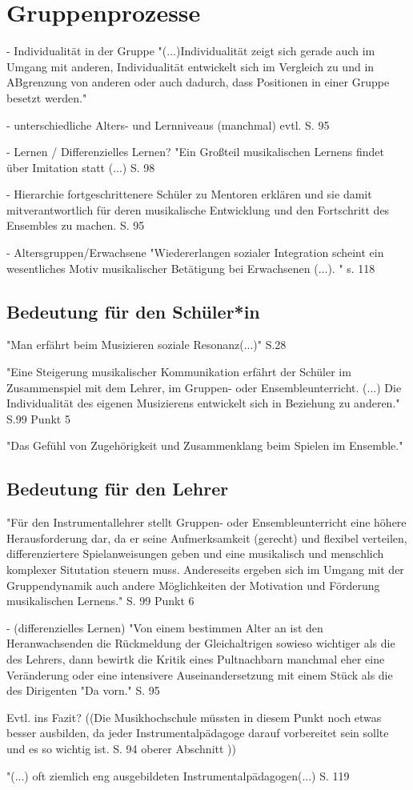 \section{Gruppenprozesse}


- Individualität in der Gruppe 
"(...)Individualität zeigt sich gerade auch im Umgang mit anderen,
Individualität entwickelt sich im Vergleich zu und in ABgrenzung von anderen
oder auch dadurch, dass Positionen in einer Gruppe besetzt werden."

- unterschiedliche Alters- und Lernniveaus (manchmal) evtl. S. 95

- Lernen / Differenzielles Lernen? 
"Ein Großteil musikalischen Lernens findet über Imitation statt (...) S. 98

- Hierarchie
fortgeschrittenere Schüler zu Mentoren erklären und sie damit mitverantwortlich
für deren musikalische Entwicklung und den Fortschritt des Ensembles zu machen.
S. 95

- Altersgruppen/Erwachsene
"Wiedererlangen sozialer Integration scheint ein wesentliches Motiv
musikalischer Betätigung bei Erwachsenen (...). " s. 118


\subsection*{Bedeutung für den Schüler*in}

"Man erfährt beim Musizieren soziale Resonanz(...)" S.28

"Eine Steigerung musikalischer Kommunikation erfährt der Schüler im
Zusammenspiel mit dem Lehrer, im Gruppen- oder Ensembleunterricht. (...) Die Individualität des eigenen Musizierens entwickelt sich in
Beziehung zu
anderen."  S.99 Punkt 5

"Das Gefühl von Zugehörigkeit und Zusammenklang beim Spielen im Ensemble."


\subsection*{Bedeutung für den Lehrer}

"Für den Instrumentallehrer stellt Gruppen- oder Ensembleunterricht eine höhere
Herausforderung dar, da er seine Aufmerksamkeit (gerecht) und flexibel
verteilen, differenziertere Spielanweisungen geben und eine musikalisch und
menschlich komplexer Situtation steuern muss. Andereseits ergeben sich im Umgang
mit der Gruppendynamik auch andere Möglichkeiten der Motivation und Förderung
musikalischen Lernens." S. 99 Punkt 6

- (differenzielles Lernen)
"Von einem bestimmen Alter an ist den Heranwachsenden die Rückmeldung der
Gleichaltrigen sowieso wichtiger als die des Lehrers, dann bewirtk die Kritik
eines Pultnachbarn manchmal eher eine Veränderung oder eine intensivere
Auseinandersetzung mit einem Stück als die des Dirigenten "Da vorn." S. 95


Evtl. ins Fazit? ((Die Musikhochschule müssten in diesem Punkt noch etwas besser ausbilden, da
jeder Instrumentalpädagoge darauf vorbereitet sein sollte und es so wichtig ist.
S. 94 oberer Abschnitt ))

"(...) oft ziemlich eng ausgebildeten Instrumentalpädagogen(...) S. 119

